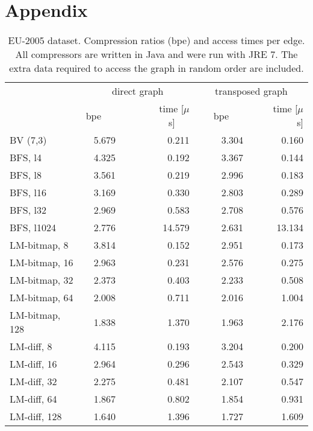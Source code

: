\documentclass[envcountsame]{llncs}
\begin{document}



\section*{Appendix}


\begin{table}
\centering
\begin{tabular}{lrrrr}
\hline
        & \multicolumn{2}{c}{direct graph} & \multicolumn{2}{c}{transposed graph} \\
\cline{2-5}
        &  bpe~~~&~~~time [$\mu$s]~~~&~~~bpe~~~&~~~time [$\mu$s] \\
\hline
BV (7,3) & 5.679 & 0.211 & 3.304 & 0.160 \\
BFS, l4 & 4.325 & 0.192 & 3.367 & 0.144 \\
BFS, l8 & 3.561 & 0.219 & 2.996 & 0.183 \\
BFS, l16 & 3.169 & 0.330 & 2.803 & 0.289 \\
BFS, l32 & 2.969 & 0.583 & 2.708 & 0.576 \\
BFS, l1024 & 2.776 & 14.579 & 2.631 & 13.134 \\
LM-bitmap, 8 & 3.814 & 0.152 & 2.951 & 0.173 \\
LM-bitmap, 16 & 2.963 & 0.231 & 2.576 & 0.275 \\
LM-bitmap, 32 & 2.373 & 0.403 & 2.233 & 0.508 \\
LM-bitmap, 64 & 2.008 & 0.711 & 2.016 & 1.004 \\
LM-bitmap, 128 & 1.838 & 1.370 & 1.963 & 2.176 \\
LM-diff, 8 & 4.115 & 0.193 & 3.204 & 0.200 \\
LM-diff, 16 & 2.964 & 0.296 & 2.543 & 0.329 \\
LM-diff, 32 & 2.275 & 0.481 & 2.107 & 0.547 \\
LM-diff, 64 & 1.867 & 0.802 & 1.854 & 0.931 \\
LM-diff, 128 & 1.640 & 1.396 & 1.727 & 1.609 \\
\hline
\end{tabular}
\vspace{4mm}
\caption{EU-2005 dataset. Compression ratios (bpe) and access times per edge. 
All compressors are written in Java and were run with JRE 7.
The extra data required to access the graph in random order are included.
}
\label{table:app_eu}
\end{table}
\end{document}
